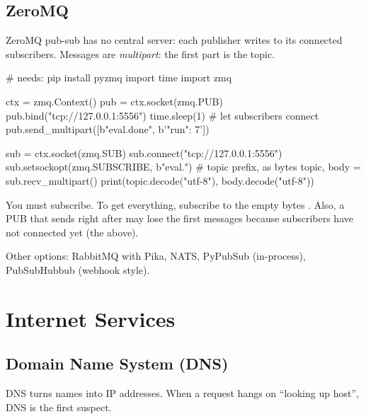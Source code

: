 \subsection{ZeroMQ}

ZeroMQ pub-sub has no central server: each publisher writes to its connected
subscribers. Messages are \emph{multipart}: the first part is the topic.

\begin{pycode}
# needs: pip install pyzmq
import time
import zmq

ctx = zmq.Context()
pub = ctx.socket(zmq.PUB)
pub.bind("tcp://127.0.0.1:5556")
time.sleep(1)                                  # let subscribers connect
pub.send_multipart([b"eval.done", b'{"run": 7}'])

sub = ctx.socket(zmq.SUB)
sub.connect("tcp://127.0.0.1:5556")
sub.setsockopt(zmq.SUBSCRIBE, b"eval.")        # topic prefix, as bytes
topic, body = sub.recv_multipart()
print(topic.decode("utf-8"), body.decode("utf-8"))
\end{pycode}

\begin{trap}
You must subscribe. To get everything, subscribe to the empty bytes . Also,
a PUB that sends right after  may lose the first messages because subscribers
have not connected yet (the  above).
\end{trap}

Other options: RabbitMQ with Pika, NATS, PyPubSub (in-process), PubSubHubbub (webhook style).

\section{Internet Services}

\subsection{Domain Name System (DNS)}

DNS turns names into IP addresses. When a request hangs on ``looking up host'', DNS is
the first suspect.

